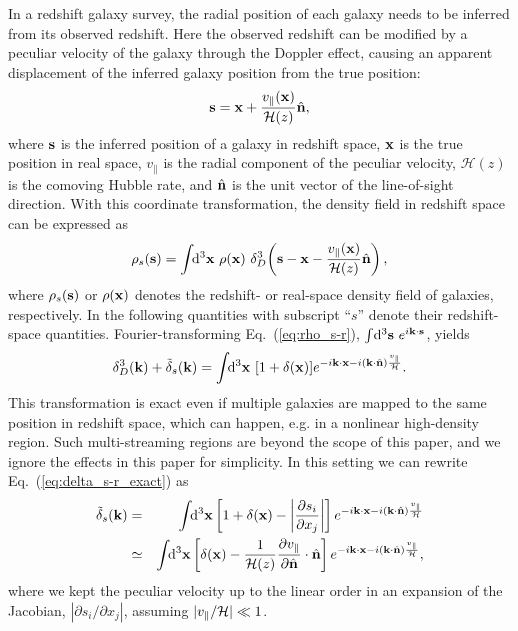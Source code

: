 \documentclass[prd,onecolumn,notitlepage,amsmath,amssymb,floatfix,superscriptaddress]{revtex4-1}
\newcommand{\bx}{{\bf x}}
\newcommand{\bs}{{\bf s}}
\newcommand{\bk}{{\bf k}}
\newcommand{\bn}{{\bf n}}
\newcommand{\tdelta}{\tilde{\delta}}
\begin{document}
In a redshift galaxy survey, 
the radial position of each galaxy 
needs to be inferred from its observed redshift. Here 
the observed redshift can be  modified by a peculiar velocity of the galaxy through the Doppler effect, 
causing an apparent displacement of the inferred galaxy position from the true position:
%
\begin{equation}
\bs=\bx + \frac{v_{\parallel}(\bx)}{\mathcal{H}(z)}\hat{\bn}, 
\label{eq:s_x}
\end{equation}
%
where $\bs$ is the inferred position of a galaxy in redshift space, $\bx$
is the true position in real space, $v_{\parallel}$ is the radial component of the peculiar velocity,
$\mathcal{H}(z)$ is the comoving Hubble rate, and $\hat{\bn}$ is the unit vector of 
the line-of-sight direction. 
With this coordinate transformation, the density field in redshift space can be expressed as
%
\begin{equation}
\rho_s(\bs) = \int\!\!\mathrm{d}^3\bx~\rho(\bx)~\delta_D^{3}\! \left(\bs - \bx -\frac{v_{\parallel}(\bx)}{\mathcal{H}(z)}\hat{\bn}\right) , 
\label{eq:rho_s-r}
\end{equation}
%
where $\rho_s(\bs)$ or $\rho(\bx)$ denotes the redshift- or real-space density field of galaxies, respectively.
In the following quantities with subscript ``$s$'' denote their redshift-space 
quantities.
Fourier-transforming Eq.~(\ref{eq:rho_s-r}), $\int\!\mathrm{d}^3\bs~e^{i\bk\cdot\bs}$, yields
% 
\begin{equation}
\delta_D^{3}(\bk) + \tdelta_s(\bk) = \int\!\!\mathrm{d}^3 \bx ~ [1+\delta(\bx)] e^{-i\bk\cdot\bx - i(\bk \cdot \hat{\bn})\frac{v_{\parallel}}{\mathcal{H}}} .
\label{eq:delta_s-r_exact}
\end{equation}
%
This transformation is exact even if multiple galaxies are mapped to the same position in redshift space, which can happen, e.g. in a nonlinear high-density region.
Such multi-streaming regions are 
beyond the scope of this paper, 
and we ignore the effects in this paper for simplicity. 
In this setting we can rewrite Eq.~(\ref{eq:delta_s-r_exact}) as 
%
\begin{eqnarray}
\tdelta_s(\bk) &=& \int\!\!\mathrm{d}^3 \bx \left[1+\delta(\bx)-\left|\frac{\partial s_i}{\partial x_j}\right| \right]
 e^{-i\bk\cdot\bx - i(\bk \cdot \hat{\bn})\frac{v_{\parallel}}{\mathcal{H}}} \nonumber \\
&\simeq & \int\!\!\mathrm{d}^3 \bx \left[\delta(\bx) - \frac{1}{\mathcal{H}(z)}\frac{\partial v_{\parallel}}{\partial \hat{\bn}}\cdot\hat{\bn}\right]
  e^{-i\bk\cdot\bx - i(\bk \cdot \hat{\bn})\frac{v_{\parallel}}{\mathcal{H}}},
 \label{eq:delta_s-r}
\end{eqnarray}%
%
where we kept the peculiar velocity up to the linear order in an expansion of the Jacobian, $|\partial s_i/\partial x_j|$, assuming 
$|v_\parallel/{\cal H}|\ll 1$.
\end{document}
